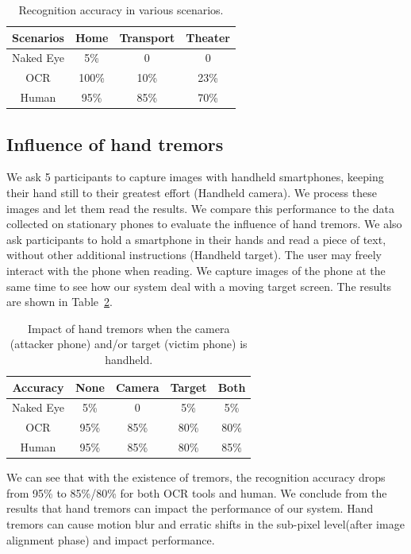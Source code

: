 \begin{table}[!t]
    \centering
    \caption{Recognition accuracy in various scenarios.}
    \begin{tabular}{@{}cccc@{}}
        \toprule
    Scenarios & Home & Transport & Theater \\ \midrule
    Naked Eye & 5\% & 0 & 0\\ 
    \midrule
    OCR & 100\% & 10\% & 23\%\\ 
    Human & 95\% & 85\% & 70\%\\ \bottomrule
    \end{tabular}
    \label{table-scenarios}
\end{table}

\subsection{Influence of hand tremors}
We ask 5 participants to capture images with handheld smartphones, keeping their hand still to their greatest effort (Handheld camera). We process these images and let them read the results. We compare this performance to the data collected on stationary phones to evaluate the influence of hand tremors.
We also ask participants to hold a smartphone in their hands and read a piece of text, without other additional instructions (Handheld target). The user may freely interact with the phone when reading. We capture images of the phone at the same time to see how our system deal with a moving target screen. The results are shown in Table~\ref{table-tremor}.

\begin{table}[!t] 
    \centering
    \caption{Impact of hand tremors when the camera (attacker phone) and/or target (victim phone) is handheld.}
    \begin{tabular}{ccccc}
        \toprule
    Accuracy & None & Camera & Target & Both  \\
    \midrule
    Naked Eye & 5\% & 0 & 5\% & 5\%\\ 
    \midrule
    OCR & 95\% & 85\% & 80\% & 80\%\\ 
    Human & 95\% & 85\% & 80\% & 85\%\\ \bottomrule
    \end{tabular}
    \label{table-tremor}
\end{table}

We can see that with the existence of tremors, the recognition accuracy drops from 95\% to 85\%/80\% for both OCR tools and human. We conclude from the results that hand tremors can impact the performance of our system. Hand tremors can cause motion blur and erratic shifts in the sub-pixel level(after image alignment phase) and impact performance.


